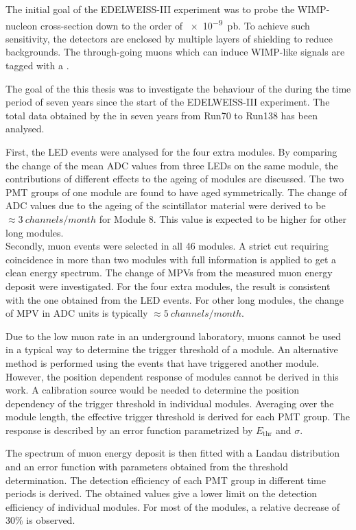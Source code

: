 The initial goal of the EDELWEISS-III experiment was to probe the WIMP-nucleon cross-section down to the order of \SI{e-9}{pb}. To achieve such sensitivity, the detectors are enclosed by multiple layers of shielding to reduce backgrounds. The through-going muons which can induce WIMP-like signals are tagged with a \mvs{}.

The goal of the this thesis was to investigate the behaviour of the \mvs{} during the time period of seven years since the start of the EDELWEISS-III experiment. The total data obtained by the \mvs{} in seven years from Run70 to Run138 has been analysed.

First, the LED events were analysed for the four extra modules. By comparing the change of the mean ADC values from three LEDs on the same module, the contributions of different effects to the ageing of modules are discussed. The two PMT groups of one module are found to have aged symmetrically. The change of ADC values due to the ageing of the scintillator material were derived to be $\approx \SI{3}{channels\per month}$ for Module 8. This value is expected to be higher for other long modules.\\
Secondly, muon events were selected in all 46 modules. A strict cut requiring coincidence in more than two modules with full information is applied to get a clean energy spectrum. The change of MPVs from the measured muon energy deposit were investigated. For the four extra modules, the result is consistent with the one obtained from the LED events. For other long modules, the change of MPV in ADC units is typically $\approx \SI{5}{channels\per month}$.

Due to the low muon rate in an underground laboratory, muons cannot be used in a typical way to determine the trigger threshold of a module. An alternative method is performed using the events that have triggered another module.
However, the position dependent response of modules cannot be derived in this work. A calibration source would be needed to determine the position dependency of the trigger threshold in individual modules.
Averaging over the module length, the effective trigger threshold is derived for each PMT group. The response is described by an error function parametrized by $E_{\mathrm{thr}}$ and $\sigma$.

The spectrum of muon energy deposit is then fitted with a Landau distribution and an error function with parameters obtained from the threshold determination. The detection efficiency of each PMT group in different time periods is derived. The obtained values give a lower limit on the detection efficiency of individual modules. For most of the modules, a relative decrease of 30\% is observed.

